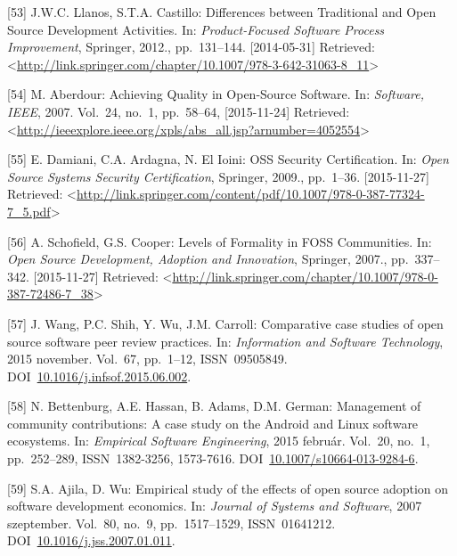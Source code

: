 \documentclass[12pt,magyar,a4paper,oneside]{scrreprt}
\begin{document}
\leavevmode\hypertarget{ref-llanos_differences_2012}{}%
{[}53{]} J.W.C. Llanos, S.T.A. Castillo: Differences between Traditional
and Open Source Development Activities. In: \emph{Product-Focused
Software Process Improvement}, Springer, 2012., pp.~131--144.
{[}2014-05-31{]} Retrieved:
\textless{}\url{http://link.springer.com/chapter/10.1007/978-3-642-31063-8_11}\textgreater{}

\leavevmode\hypertarget{ref-aberdour_achieving_2007}{}%
{[}54{]} M. Aberdour: Achieving Quality in Open-Source Software. In:
\emph{Software, IEEE}, 2007. Vol.~24, no.~1, pp.~58--64,
{[}2015-11-24{]} Retrieved:
\textless{}\url{http://ieeexplore.ieee.org/xpls/abs_all.jsp?arnumber=4052554}\textgreater{}

\leavevmode\hypertarget{ref-damiani_oss_2009}{}%
{[}55{]} E. Damiani, C.A. Ardagna, N. El Ioini: OSS Security
Certification. In: \emph{Open Source Systems Security Certification},
Springer, 2009., pp.~1--36. {[}2015-11-27{]} Retrieved:
\textless{}\url{http://link.springer.com/content/pdf/10.1007/978-0-387-77324-7_5.pdf}\textgreater{}

\leavevmode\hypertarget{ref-schofield_levels_2007}{}%
{[}56{]} A. Schofield, G.S. Cooper: Levels of Formality in FOSS
Communities. In: \emph{Open Source Development, Adoption and
Innovation}, Springer, 2007., pp.~337--342. {[}2015-11-27{]} Retrieved:
\textless{}\url{http://link.springer.com/chapter/10.1007/978-0-387-72486-7_38}\textgreater{}

\leavevmode\hypertarget{ref-wang_comparative_2015}{}%
{[}57{]} J. Wang, P.C. Shih, Y. Wu, J.M. Carroll: Comparative case
studies of open source software peer review practices. In:
\emph{Information and Software Technology}, 2015 november. Vol.~67,
pp.~1--12, ISSN~09505849.
DOI~\href{https://doi.org/10.1016/j.infsof.2015.06.002}{10.1016/j.infsof.2015.06.002}.

\leavevmode\hypertarget{ref-bettenburg_management_2015}{}%
{[}58{]} N. Bettenburg, A.E. Hassan, B. Adams, D.M. German: Management
of community contributions: A case study on the Android and Linux
software ecosystems. In: \emph{Empirical Software Engineering}, 2015
február. Vol.~20, no.~1, pp.~252--289, ISSN~1382-3256, 1573-7616.
DOI~\href{https://doi.org/10.1007/s10664-013-9284-6}{10.1007/s10664-013-9284-6}.

\leavevmode\hypertarget{ref-ajila_empirical_2007}{}%
{[}59{]} S.A. Ajila, D. Wu: Empirical study of the effects of open
source adoption on software development economics. In: \emph{Journal of
Systems and Software}, 2007 szeptember. Vol.~80, no.~9, pp.~1517--1529,
ISSN~01641212.
DOI~\href{https://doi.org/10.1016/j.jss.2007.01.011}{10.1016/j.jss.2007.01.011}.
\end{document}
